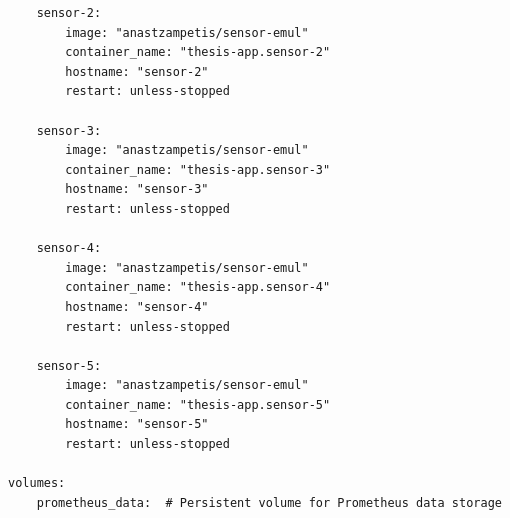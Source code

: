 \begin{verbatim}
    sensor-2:
        image: "anastzampetis/sensor-emul"
        container_name: "thesis-app.sensor-2"
        hostname: "sensor-2"
        restart: unless-stopped

    sensor-3:
        image: "anastzampetis/sensor-emul"
        container_name: "thesis-app.sensor-3"
        hostname: "sensor-3"
        restart: unless-stopped

    sensor-4:
        image: "anastzampetis/sensor-emul"
        container_name: "thesis-app.sensor-4"
        hostname: "sensor-4"
        restart: unless-stopped

    sensor-5:
        image: "anastzampetis/sensor-emul"
        container_name: "thesis-app.sensor-5"
        hostname: "sensor-5"
        restart: unless-stopped

volumes:
    prometheus_data:  # Persistent volume for Prometheus data storage
\end{verbatim}